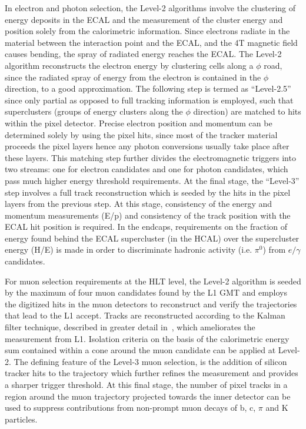 In electron and photon selection, the Level-2 algorithms involve the clustering of energy deposits in the ECAL and the measurement of the cluster energy and position solely from the calorimetric information. Since electrons radiate in the material between the interaction point and the ECAL, and the 4T magnetic field causes bending, the spray of radiated energy reaches the ECAL. The Level-2 algorithm reconstructs the electron energy by clustering cells along a $\phi$ road, since the radiated spray of energy from the electron is contained in the $\phi$ direction, to a good approximation. The following step is termed as ``Level-2.5'' since only partial as opposed to full tracking information is employed, such that superclusters (groups of energy clusters along the $\phi$ direction) are matched to hits within the pixel detector. Precise electron position and momentum can be determined solely by using the pixel hits, since most of the tracker material proceeds the pixel layers hence any photon conversions usually take place after these layers. This matching step further divides the electromagnetic triggers into two streams: one for electron candidates and one for photon candidates, which pass much higher energy threshold requirements. At the final stage, the ``Level-3'' step involves a full track reconstruction which is seeded by the hits in the pixel layers from the previous step. At this stage, consistency of the energy and momentum measurements (E/p) and consistency of the track position with the ECAL hit position is required. In the endcaps, requirements on the fraction of energy found behind the ECAL supercluster (in the HCAL) over the supercluster energy (H/E) is made in order to discriminate hadronic activity (i.e. $\pi^{0}$) from $e/\gamma$ candidates. 

For muon selection requirements at the HLT level, the Level-2 algorithm is seeded by the maximum of four muon candidates found by the L1 GMT and employs the digitized hits in the muon detectors to reconstruct and verify the trajectories that lead to the L1 accept. Tracks are reconstructed according to the Kalman filter technique, described in greater detail in~\cite{Fruhwirth:1987fm}, which ameliorates the \pt measurement from L1. Isolation criteria on the basis of the calorimetric energy sum contained within a cone around the muon candidate can be applied at Level-2. The defining feature of the Level-3 muon selection, is the addition of silicon tracker hits to the trajectory which further refines the \pt measurement and provides a sharper trigger threshold. At this final stage, the number of pixel tracks in a region around the muon trajectory projected towards the inner detector can be used to suppress contributions from non-prompt muon decays of b, c, $\pi$ and K particles.

